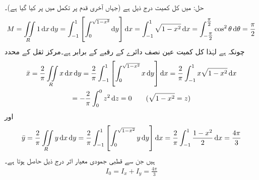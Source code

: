 حل: میں کل کمیت  درج ذیل ہے (جہاں آخری قدم پر تکمل میں  پر کیا گیا ہے)۔
\begin{align*}
M=\iint\limits_R 1\dif x\dif y=\int_{-1}^1 \left[\int_0^{\sqrt{1-x^2}} \dif y\right]\dif x=\int_{-1}^1 \sqrt{1-x^2}\dif x=\int_{-\tfrac{\pi}{2}}^{\tfrac{\pi}{2}}\cos^2 \theta \dif \theta=\frac{\pi}{2}
\end{align*}
چونکہ  ہے لہٰذا کل کمیت عین نصف دائرے کے رقبے کے برابر ہے۔مرکز ثقل کے محدد
\begin{multline*}
\bar{x}=\frac{2}{\pi}\iint\limits_R x\dif x\dif y=\frac{2}{\pi}\int_{-1}^1 \left[\int_{0}^{\sqrt{1-x^2}} x\dif y\right]\dif x=\frac{2}{\pi}\int_{-1}^1 x\sqrt{1-x^2}\dif x\\
=-\frac{2}{\pi}\int_0^0 z^2 \dif z=0\quad \quad (\sqrt{1-x^2}=z)
\end{multline*}
اور
\begin{multline*}
\bar{y}=\frac{2}{\pi}\iint\limits_R y\dif x\dif y=\frac{2}{\pi}\int_{-1}^1 \left[\int_{0}^{\sqrt{1-x^2}} y\dif y\right]\dif x=\frac{2}{\pi}\int_{-1}^1 \frac{1-x^2}{2}\dif x=\frac{4\pi}{3}
\end{multline*}
ہیں جن سے قطبی جمودی معیار اثر درج ذیل حاصل ہوتا ہے۔
\begin{align*}
I_0=I_x+I_y=\frac{4\pi}{3}
\end{align*}
